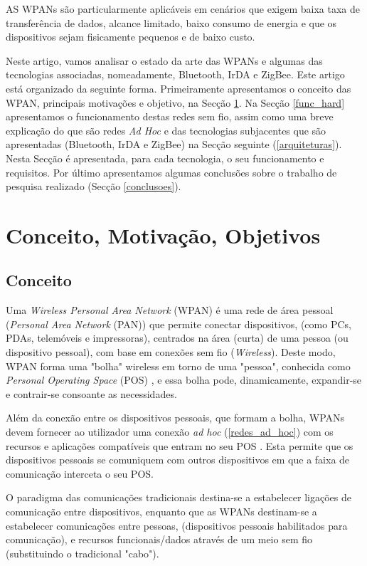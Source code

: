 \documentclass[conference]{IEEEtran}
\begin{document}
AS WPANs são particularmente aplicáveis em cenários que exigem baixa taxa de transferência de dados, alcance limitado, baixo consumo de energia e que os dispositivos sejam fisicamente pequenos e de baixo custo.

Neste artigo, vamos analisar o estado da arte das WPANs e algumas das tecnologias associadas, nomeadamente, Bluetooth, IrDA e ZigBee.
Este artigo está organizado da seguinte forma.
Primeiramente apresentamos o conceito das WPAN, principais motivações e objetivo, na Secção \ref{conc_mot_obj}.
Na Secção \ref{func_hard} apresentamos o funcionamento destas redes sem fio, assim como uma breve explicação do que são redes \textit{Ad Hoc} e das tecnologias subjacentes que são apresentadas (Bluetooth, IrDA e ZigBee) na Secção seguinte (\ref{arquiteturas}).
Nesta Secção é apresentada, para cada tecnologia, o seu funcionamento e requisitos.
Por último apresentamos algumas conclusões sobre o trabalho de pesquisa realizado (Secção \ref{conclusoes}).


\section{Conceito, Motivação, Objetivos} \label{conc_mot_obj}

\subsection{Conceito}

Uma \textit{Wireless Personal Area Network} (WPAN) é uma rede de área pessoal (\textit{Personal Area Network} (PAN)) que permite conectar dispositivos, (como PCs, PDAs, telemóveis e impressoras), centrados na área (curta) de uma pessoa (ou dispositivo pessoal), com base em conexões sem fio (\textit{Wireless}). 
Deste modo, WPAN forma uma "bolha" wireless em torno de uma "pessoa", conhecida como \textit{Personal Operating Space} (POS) \cite{prasad2004ofdm}, e essa bolha pode, dinamicamente, expandir-se e contrair-se consoante as necessidades.

Além da conexão entre os dispositivos pessoais, que formam a bolha, WPANs devem fornecer ao utilizador uma conexão \textit{ad hoc} (\ref{redes_ad_hoc}) com os recursos e aplicações compatíveis que entram no seu POS \cite{prasad2004ofdm}.
Esta permite que os dispositivos pessoais se comuniquem com outros dispositivos em que a faixa de comunicação interceta o seu POS.

O paradigma das comunicações tradicionais destina-se a estabelecer ligações de comunicação entre dispositivos, enquanto que as WPANs destinam-se a estabelecer comunicações entre pessoas, (dispositivos pessoais habilitados para comunicação), e recursos funcionais/dados através de um meio sem fio (substituindo o tradicional "cabo").
\end{document}
